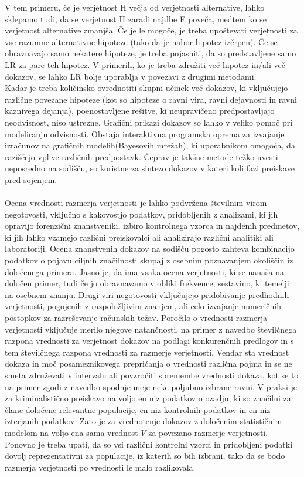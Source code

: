 \documentclass[12pt,a4paper]{amsart}
\theoremstyle{definition} %
\theoremstyle{plain} %
\begin{document}
V tem primeru, če je verjetnost H večja od verjetnosti alternative, lahko sklepamo tudi, da se verjetnost H zaradi najdbe E poveča, medtem ko se 
verjetnost alternative zmanjša. Če je le mogoče, je treba upoštevati verjetnosti za vse razumne alternativne hipoteze (tako da je nabor hipotez 
izčrpen). Če se obravnavajo samo nekatere hipoteze, je treba pojasniti, da so predstavljene samo LR za pare teh hipotez. V primerih, ko je treba 
združiti več hipotez in/ali več dokazov, se lahko LR bolje uporablja v povezavi z drugimi metodami.\\
Kadar je treba količinsko ovrednotiti skupni učinek več dokazov, ki vključujejo različne povezane hipoteze (kot so hipoteze o ravni vira, ravni 
dejavnosti in ravni kaznivega dejanja), poenostavljene rešitve, ki neupravičeno predpostavljajo neodvisnost, niso ustrezne. Grafični prikazi dokazov 
so lahko v veliko pomoč pri modeliranju odvisnosti. Obstaja interaktivna programska oprema za izvajanje izračunov na grafičnih modelih(Bayesovih mrežah), 
ki uporabnikom omogoča, da raziščejo vplive različnih predpostavk. Čeprav je takšne metode težko uvesti neposredno na sodišču, so koristne za sintezo 
dokazov v kateri koli fazi preiskave pred sojenjem.\\\\
Ocena vrednosti razmerja verjetnosti je lahko podvržena številnim virom negotovosti, vključno s kakovostjo podatkov, pridobljenih z analizami, ki jih 
opravijo forenzični znanstveniki, izbiro kontrolnega vzorca in najdenih predmetov, ki jih lahko vzamejo različni preiskovalci ali analizirajo različni 
analitiki ali laboratoriji. Ocena znanstvenih dokazov na sodišču pogosto zahteva kombinacijo podatkov o pojavu ciljnih značilnosti skupaj z osebnim poznavanjem 
okoliščin iz določenega primera. Jasno je, da ima vsaka ocena verjetnosti, ki se nanaša na določen primer, tudi če jo obravnavamo v obliki frekvence, sestavino, 
ki temelji na osebnem znanju. Drugi viri negotovosti vključujejo pridobivanje predhodnih verjetnosti, pogojenih z razpoložljivim znanjem, ali celo 
izvajanje numeričnih postopkov za razreševanje računskih težav. Poročilo o vrednosti razmerja verjetnosti vključuje merilo njegove natančnosti, na primer z 
navedbo številčnega razpona vrednosti za verjetnost dokazov na podlagi konkurenčnih predlogov in s tem številčnega razpona vrednosti za razmerje verjetnosti. 
Vendar sta vrednost dokaza in moč posameznikovega prepričanja o vrednosti različna pojma in se ne smeta združevati v intervalu ali povzročiti spremembe 
vrednosti dokaza, kot se to na primer zgodi z navedbo spodnje meje neke poljubno izbrane ravni. V praksi je za kriminalistično preiskavo na voljo en niz 
podatkov o ozadju, ki so značilni za člane določene relevantne populacije, en niz kontrolnih podatkov in en niz izterjanih podatkov. Zato je za vrednotenje 
dokazov z določenim statističnim modelom na voljo ena sama vrednost $V$ za povezano razmerje verjetnosti. Ponovno je treba upati, da so vsi različni kontrolni 
vzorci in pridobljeni podatki dovolj reprezentativni za populacije, iz katerih so bili izbrani, tako da se bodo razmerja verjetnosti po vrednosti le malo 
razlikovala. 
\end{document}
